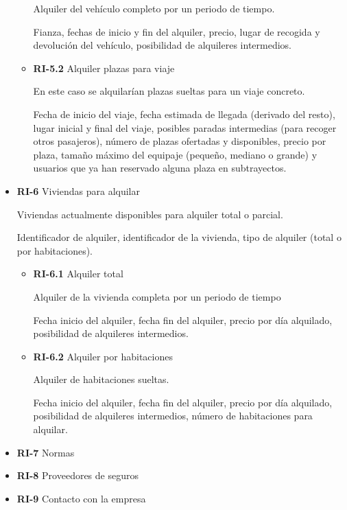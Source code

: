 \documentclass[11pt,spanish]{article} %
\begin{document}
\begin{itemize}
\begin{itemize}
		Alquiler del vehículo completo por un periodo de tiempo.
		
		Fianza, fechas de inicio y fin del alquiler, precio, lugar de recogida y devolución del vehículo, posibilidad de alquileres intermedios.
		
		\item \textbf{RI-5.2} Alquiler plazas para viaje
		
		En este caso se alquilarían plazas sueltas para un viaje concreto.
		
		Fecha de inicio del viaje, fecha estimada de llegada (derivado del resto), lugar inicial y final del viaje, posibles paradas intermedias (para recoger otros pasajeros), número de plazas ofertadas y disponibles, precio por plaza, tamaño máximo del equipaje (pequeño, mediano o grande) y usuarios que ya han reservado alguna plaza en subtrayectos.
	\end{itemize}

	\item \textbf{RI-6} Viviendas para alquilar
	
	Viviendas actualmente disponibles para alquiler total o parcial.
	
	Identificador de alquiler, identificador de la vivienda, tipo de alquiler (total o por habitaciones). 
		
	\begin{itemize}
		\item \textbf{RI-6.1} Alquiler total
		
		Alquiler de la vivienda completa por un periodo de tiempo
		
		Fecha inicio del alquiler, fecha fin del alquiler, precio por día alquilado, posibilidad de alquileres intermedios.
		
		\item \textbf{RI-6.2} Alquiler por habitaciones
		
		Alquiler de habitaciones sueltas.
		
		Fecha inicio del alquiler, fecha fin del alquiler, precio por día alquilado, posibilidad de alquileres intermedios, número de habitaciones para alquilar.
	\end{itemize}

	\item \textbf{RI-7} Normas
	\item \textbf{RI-8} Proveedores de seguros
	\item \textbf{RI-9} Contacto con la empresa	
\end{itemize}
\end{document}
